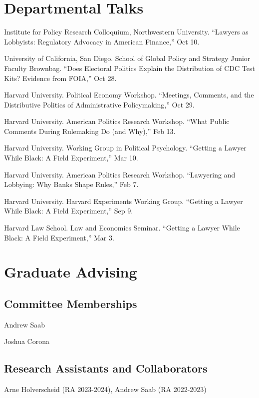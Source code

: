 \documentclass[12pt,letterpaper]{report}
\newcommand{\talk}[4]{\item[#1]{\tab{}#3. \enquote{#2,} #4.}} %
\begin{document}

    \section*{Departmental Talks}

    \begin{tablist}
	\talk{2022}{Lawyers as Lobbyists: Regulatory Advocacy in American Finance}{Institute for Policy Research Colloquium, Northwestern University}{Oct 10}
    \talk{2020}{Does Electoral Politics Explain the Distribution of CDC Test Kits? Evidence from FOIA}{ University of California, San Diego. School of Global Policy and Strategy Junior Faculty Brownbag}{Oct 28}
    \talk{2018}{Meetings, Comments, and the Distributive Politics of Administrative Policymaking}{Harvard University. Political Economy Workshop}{Oct 29}
	\talk{2018}{What Public Comments During Rulemaking Do (and Why)}{Harvard University. American Politics Research Workshop}{Feb 13}
    \talk{2017}{Getting a Lawyer While Black: A Field Experiment}{Harvard University. Working Group in Political Psychology}{Mar 10}
    \talk{2017}{Lawyering and Lobbying: Why Banks Shape Rules}{Harvard University. American Politics Research Workshop}{Feb 7}
    \talk{2016}{Getting a Lawyer While Black: A Field Experiment}{Harvard University. Harvard Experiments Working Group}{Sep 9}
    \talk{2016}{Getting a Lawyer While Black: A Field Experiment}{Harvard Law School. Law and Economics Seminar}{Mar 3}
    \end{tablist}    
    \section*{Graduate Advising}
    \subsection*{Committee Memberships}
    \begin{tablist}
    \item Andrew Saab
    \item Joshua Corona


    \end{tablist}
    \subsection*{Research Assistants and Collaborators}
    Arne Holverscheid (RA 2023-2024), Andrew Saab (RA 2022-2023)
\end{document}
